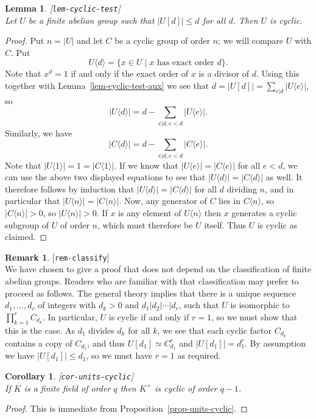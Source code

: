 \documentclass{amsart}
\newcommand{\lbl}[1]{\label{#1}\textup{[\texttt{#1}]}\ \\}
\newcommand{\lbl}{\label}
\newcommand{\st}        {\;|\;}
\newcommand{\tm}        {\times}
\newcommand{\ip}[1]     {\langle #1\rangle}
\renewcommand{\:}{\colon}
\newtheorem{lemma}[theorem]{Lemma}
\newtheorem{corollary}[theorem]{Corollary}
\theoremstyle{definition}
\newtheorem{remark}[theorem]{Remark}
\begin{document}
\begin{lemma}\lbl{lem-cyclic-test}
 Let $U$ be a finite abelian group such that $|U[d]|\leq d$
 for all $d$.  Then $U$ is cyclic.
\end{lemma}
\begin{proof}
 Put $n=|U|$ and let $C$ be a cyclic group of order $n$; we will
 compare $U$ with $C$.  Put
 \[ U\ip{d} = \{x\in U\st x \text{ has exact order } d\}. \]
 Note that $x^d=1$ if and only if the exact order of $x$ is a divisor
 of $d$.  Using this together with Lemma~\ref{lem-cyclic-test-aux} we
 see that $d=|U[d]|=\sum_{e|d}|U\ip{e}|$, so 
 \[ |U\ip{d}| = d - \sum_{e|d,e<d} |U\ip{e}|.  \]
 Similarly, we have 
 \[ |C\ip{d}| = d - \sum_{e|d,e<d} |C\ip{e}|.  \]
 Note that $|U\ip{1}|=1=|C\ip{1}|$.  If we know that
 $|U\ip{e}|=|C\ip{e}|$ for all $e<d$, we can use the above two
 displayed equations to see that $|U\ip{d}|=|C\ip{d}|$ as well.  It
 therefore follows by induction that $|U\ip{d}|=|C\ip{d}|$ for all $d$
 dividing $n$, and in particular that $|U\ip{n}|=|C\ip{n}|$.  Now, any
 generator of $C$ lies in $C\ip{n}$, so $|C\ip{n}|>0$, so
 $|U\ip{n}|>0$.  If $x$ is any element of $U\ip{n}$ then $x$ generates
 a cyclic subgroup of $U$ of order $n$, which must therefore be $U$
 itself.  Thus $U$ is cyclic as claimed.
\end{proof}

\begin{remark}\lbl{rem-classify}
 We have chosen to give a proof that does not depend on the
 classification of finite abelian groups.  Readers who are familiar
 with that classification may prefer to proceed as follows.  The
 general theory implies that there is a unique sequence
 $d_1,\dotsc,d_r$ of integers with $d_k>0$ and $d_1|d_2|\dotsb|d_r$,
 such that $U$ is isomorphic to $\prod_{k=1}^rC_{d_k}$.  In
 particular, $U$ is cyclic if and only if $r=1$, so we must show that
 this is the case.  As $d_1$ divides $d_k$ for all $k$, we see that
 each cyclic factor $C_{d_k}$ contains a copy of $C_{d_1}$, and thus
 $U[d_1]\simeq C_{d_1}^r$ and $|U[d_1]|=d_1^r$.  By assumption we have
 $|U[d_1]|\leq d_1$, so we must have $r=1$ as required.
\end{remark}

\begin{corollary}\lbl{cor-units-cyclic}
 If $K$ is a finite field of order $q$ then $K^\tm$ is cyclic of order
 $q-1$.
\end{corollary}
\begin{proof}
 This is immediate from Proposition~\ref{prop-units-cyclic}.
\end{proof}
\end{document}
